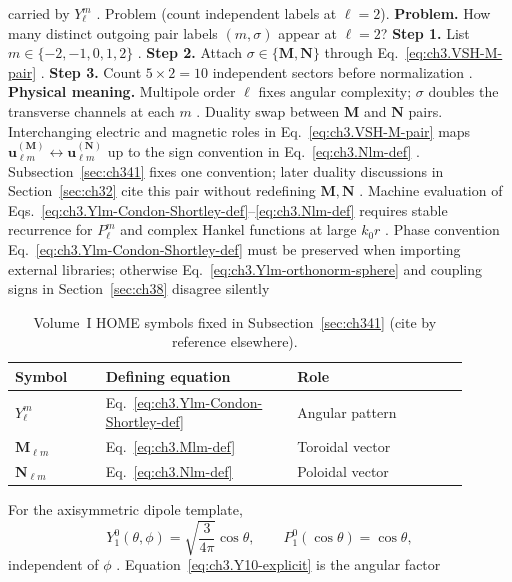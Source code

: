 carried by \(Y_{\ell}^{m}\) .
Problem (count independent labels at \(\ell=2\)). \textbf{Problem.} How many distinct outgoing pair labels \((m,\sigma)\) appear at \(\ell=2\)?
\textbf{Step 1.} List \(m\in\{-2,-1,0,1,2\}\) .
\textbf{Step 2.} Attach \(\sigma\in\{\mathbf{M},\mathbf{N}\}\) through Eq.~\eqref{eq:ch3.VSH-M-pair} .
\textbf{Step 3.} Count \(5\times2=10\) independent sectors before normalization .
\textbf{Physical meaning.} Multipole order \(\ell\) fixes angular complexity; \(\sigma\) doubles the transverse channels
at each \(m\) .
Duality swap between \(\mathbf{M}\) and \(\mathbf{N}\) pairs. Interchanging electric and magnetic roles in Eq.~\eqref{eq:ch3.VSH-M-pair} maps
\(\mathbf{u}_{\ell m}^{(\mathbf{M})}\leftrightarrow\mathbf{u}_{\ell m}^{(\mathbf{N})}\) up to the sign convention in
Eq.~\eqref{eq:ch3.Nlm-def} . Subsection~\ref{sec:ch341} fixes one convention; later duality
discussions in Section~\ref{sec:ch32} cite this pair without redefining \(\mathbf{M},\mathbf{N}\) .
Machine evaluation of Eqs.~\eqref{eq:ch3.Ylm-Condon-Shortley-def}--\eqref{eq:ch3.Nlm-def} requires stable recurrence for
\(P_{\ell}^{m}\) and complex Hankel functions at large \(k_{0}r\) . Phase convention
Eq.~\eqref{eq:ch3.Ylm-Condon-Shortley-def} must be preserved when importing external libraries; otherwise
Eq.~\eqref{eq:ch3.Ylm-orthonorm-sphere} and coupling signs in Section~\ref{sec:ch38} disagree silently
\begin{table}[t]
\centering
\caption{Volume~I HOME symbols fixed in Subsection~\ref{sec:ch341} (cite by reference elsewhere).}
\label{tab:ch3.341-home-symbols}
\small
\begin{tabular}{@{}p{0.18\linewidth}p{0.38\linewidth}p{0.34\linewidth}@{}}
\toprule
Symbol & Defining equation & Role \\
\midrule
\(Y_{\ell}^{m}\) & Eq.~\eqref{eq:ch3.Ylm-Condon-Shortley-def} & Angular pattern \\
\(\mathbf{M}_{\ell m}\) & Eq.~\eqref{eq:ch3.Mlm-def} & Toroidal vector \\
\(\mathbf{N}_{\ell m}\) & Eq.~\eqref{eq:ch3.Nlm-def} & Poloidal vector \\
\bottomrule
\end{tabular}
\end{table}
For the axisymmetric dipole template,
\begin{equation}
\label{eq:ch3.Y10-explicit}
Y_{1}^{0}(\theta,\phi)=\sqrt{\frac{3}{4\pi}}\cos\theta,
\qquad
P_{1}^{0}(\cos\theta)=\cos\theta,
\end{equation}
independent of \(\phi\) . Equation~\eqref{eq:ch3.Y10-explicit} is the angular factor
